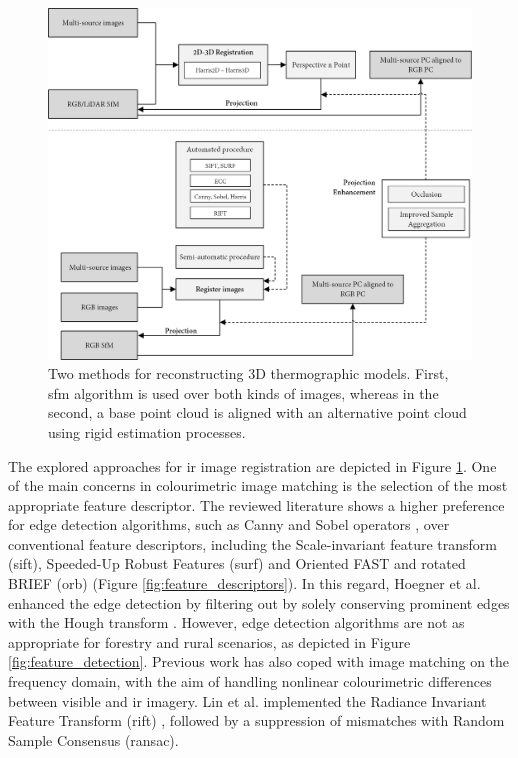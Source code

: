 \begin{figure}[ht]
	\includegraphics[width=\linewidth]{figs/context/fusion_03.png}
	\caption{Two methods for reconstructing 3D thermographic models. First, \acrshort{sfm} algorithm is used over both kinds of images, whereas in the second, a base point cloud is aligned with an alternative point cloud using rigid estimation processes. }
    \label{fig:fusion_data_03}
\end{figure}

The explored approaches for \acrshort{ir} image registration are depicted in Figure \ref{fig:fusion_data_03}. One of the main concerns in colourimetric image matching is the selection of the most appropriate feature descriptor. The reviewed literature shows a higher preference for edge detection algorithms, such as Canny and Sobel operators \cite{hoegner_3d_2016, hoegner_evaluation_2016}, over conventional feature descriptors, including the Scale-invariant feature transform (\acrshort{sift}), Speeded-Up Robust Features (\acrshort{surf}) and Oriented FAST and rotated BRIEF (\acrshort{orb}) (Figure \ref{fig:feature_descriptors}). In this regard, Hoegner et al. \cite{hoegner_evaluation_2016} enhanced the edge detection by filtering out by solely conserving prominent edges with the Hough transform \cite{hoegner_evaluation_2016}. However, edge detection algorithms are not as appropriate for forestry and rural scenarios, as depicted in Figure \ref{fig:feature_detection}. Previous work has also coped with image matching on the frequency domain, with the aim of handling nonlinear colourimetric differences between visible and \acrshort{ir} imagery. Lin et al. \cite{lin_fusion_2019} implemented the Radiance Invariant Feature Transform (\acrshort{rift}) \cite{lin_fusion_2019}, followed by a suppression of mismatches with Random Sample Consensus (\acrshort{ransac}).

